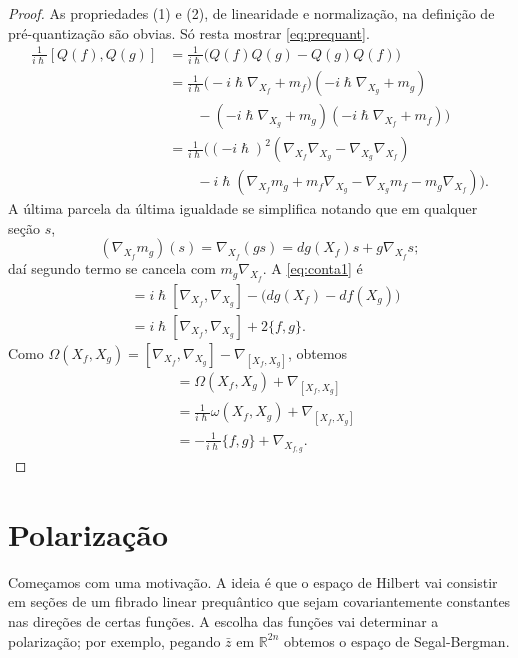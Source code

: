 \begin{proof}\leavevmode
As propriedades (1) e (2), de linearidade e normalização, na definição de pré-quantização são obvias. Só resta mostrar  \cref{eq:prequant}.
\begin{equation}\label{eq:conta1}
\begin{aligned}
	\frac{1}{i \hslash}[Q(f),Q(g)]&=\frac{1}{i \hslash}\Big(Q(f)Q(g)-Q(g)Q(f)\Big)\\
	&=\frac{1}{i \hslash}\Big(-i \hslash \nabla_{X_f}+ m_f)(-i \hslash \nabla_{X_g}+m_g)\\& \qquad -(-i \hslash \nabla_{X_g}+m_g)(-i \hslash \nabla_{X_f}+m_f) \Big)\\
	&=\frac{1}{i \hslash} \Big( (-i \hslash)^2(\nabla_{X_f}\nabla_{X_g}-\nabla_{X_g}\nabla_{X_f})\\& \qquad -i\hslash (\nabla_{X_f}m_g+m_f \nabla_{X_g}-\nabla_{X_g}m_f-m_g\nabla_{X_f}) \Big).
	\end{aligned}	\end{equation}
A última parcela da última igualdade se simplifica notando que em qualquer seção $s$,
\[\left(\nabla_{X_f}m_g\right)(s)=\nabla_{X_f}(gs)=dg(X_f)s+g\nabla_{X_f}s;\]
daí segundo termo se cancela com $m_{g}\nabla_{X_f}$. A \cref{eq:conta1} é
\begin{align*}
&=i \hslash [\nabla_{X_f},\nabla_{X_{g}}]-\Big(dg(X_f)-df(X_g) \Big)\\
&=i \hslash [\nabla_{X_f},\nabla_{X_g}]+2\{f,g\}.
\end{align*}
Como $\Omega(X_f,X_g)=[\nabla_{X_f},\nabla_{X_g}]-\nabla_{[X_{f},X_g]}$, obtemos
\begin{align*}[\nabla_{X_f},\nabla_{X_g}]&=\Omega(X_f,X_g)+\nabla_{[X_f,X_g]}\\
	&=\frac{1}{i \hslash}\omega(X_f,X_g)+\nabla_{[X_f,X_g]}\\
	&=-\frac{1}{i \hslash}\{f,g\}+\nabla_{X_{f,g}}.
\end{align*}
\end{proof}

\iffalse
\section{Polarização}

Começamos com uma motivação. A ideia é que o espaço de Hilbert vai consistir em seções de um fibrado linear prequântico que sejam covariantemente constantes nas direções de certas funções. A escolha das funções vai determinar a polarização; por exemplo, pegando $\bar{z}$ em $\mathbb{R}^{2n}$ obtemos o espaço de Segal-Bergman.

